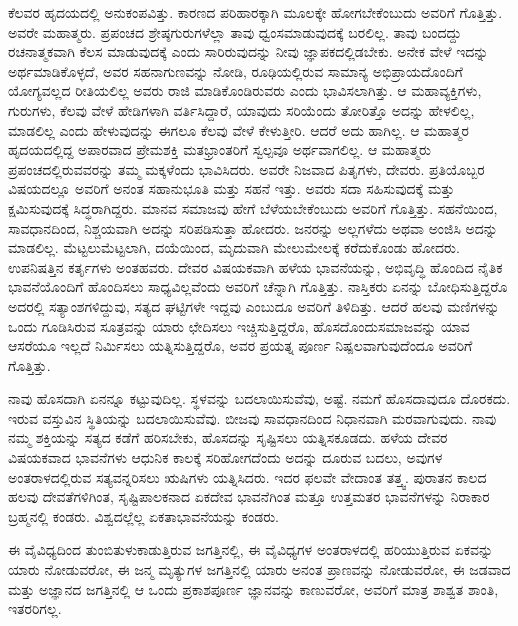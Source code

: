 \vskip 0.2cm

ಕೆಲವರ ಹೃದಯದಲ್ಲಿ ಅನುಕಂಪವಿತ್ತು. ಕಾರಣದ ಪರಿಹಾರಕ್ಕಾಗಿ ಮೂಲಕ್ಕೇ ಹೋಗಬೇಕೆಂಬುದು ಅವರಿಗೆ ಗೊತ್ತಿತ್ತು. ಅವರೇ ಮಹಾತ್ಮರು. ಪ್ರಪಂಚದ ಶ್ರೇಷ್ಠಗುರುಗಳೆಲ್ಲಾ ತಾವು ಧ್ವಂಸಮಾಡುವುದಕ್ಕೆ ಬರಲಿಲ್ಲ. ತಾವು ಬಂದದ್ದು ರಚನಾತ್ಮಕವಾಗಿ ಕೆಲಸ ಮಾಡುವುದಕ್ಕೆ ಎಂದು ಸಾರಿರುವುದನ್ನು ನೀವು ಜ್ಞಾಪಕದಲ್ಲಿಡಬೇಕು. ಅನೇಕ ವೇಳೆ ಇದನ್ನು ಅರ್ಥಮಾಡಿಕೊಳ್ಳದೆ, ಅವರ ಸಹನಾಗುಣವನ್ನು ನೋಡಿ, ರೂಢಿಯಲ್ಲಿರುವ ಸಾಮಾನ್ಯ ಅಭಿಪ್ರಾಯದೊಂದಿಗೆ ಯೋಗ್ಯವಲ್ಲದ ರೀತಿಯಲಿಲ್ಲ ಅವರು ರಾಜಿ ಮಾಡಿಕೊಂಡಿರುವರು ಎಂದು ಭಾವಿಸಲಾಗಿತ್ತು. ಆ ಮಹಾವ್ಯಕ್ತಿಗಳು, ಗುರುಗಳು, ಕೆಲವು ವೇಳೆ ಹೇಡಿಗಳಾಗಿ ವರ್ತಿಸಿದ್ದಾರೆ, ಯಾವುದು ಸರಿಯೆಂದು ತೋರಿತ್ತೊ ಅದನ್ನು ಹೇಳಲಿಲ್ಲ, ಮಾಡಲಿಲ್ಲ ಎಂದು ಹೇಳುವುದನ್ನು ಈಗಲೂ ಕೆಲವು ವೇಳೆ ಕೇಳುತ್ತೀರಿ. ಆದರೆ ಅದು ಹಾಗಿಲ್ಲ. ಆ ಮಹಾತ್ಮರ ಹೃದಯದಲ್ಲಿದ್ದ ಅಪಾರವಾದ ಪ್ರೇಮಶಕ್ತಿ ಮತಭ್ರಾಂತರಿಗೆ ಸ್ವಲ್ಪವೂ ಅರ್ಥವಾಗಲಿಲ್ಲ. ಆ ಮಹಾತ್ಮರು ಪ್ರಪಂಚದಲ್ಲಿರುವವರನ್ನು ತಮ್ಮ ಮಕ್ಕಳೆಂದು ಭಾವಿಸಿದರು. ಅವರೇ ನಿಜವಾದ ಪಿತೃಗಳು, ದೇವರು. ಪ್ರತಿಯೊಬ್ಬರ ವಿಷಯದಲ್ಲೂ ಅವರಿಗೆ ಅನಂತ ಸಹಾನುಭೂತಿ ಮತ್ತು ಸಹನೆ ಇತ್ತು. ಅವರು ಸದಾ ಸಹಿಸುವುದಕ್ಕೆ ಮತ್ತು ಕ್ಷಮಿಸುವುದಕ್ಕೆ ಸಿದ್ಧರಾಗಿದ್ದರು. ಮಾನವ ಸಮಾಜವು ಹೇಗೆ ಬೆಳೆಯಬೇಕೆಂಬುದು ಅವರಿಗೆ ಗೊತ್ತಿತ್ತು. ಸಹನೆಯಿಂದ, ಸಾವಧಾನದಿಂದ, ನಿಶ್ಚಯವಾಗಿ ಅದನ್ನು ಸರಿಪಡಿಸುತ್ತಾ ಹೋದರು. ಜನರನ್ನು ಅಲ್ಲಗಳೆದು ಅಥವಾ ಅಂಜಿಸಿ ಅದನ್ನು ಮಾಡಲಿಲ್ಲ. ಮೆಟ್ಟಲುಮೆಟ್ಟಲಾಗಿ, ದಯೆಯಿಂದ, ಮೃದುವಾಗಿ ಮೇಲುಮೇಲಕ್ಕೆ ಕರೆದುಕೊಂಡು ಹೋದರು. ಉಪನಿಷತ್ತಿನ ಕರ್ತೃಗಳು ಅಂತಹವರು. ದೇವರ ವಿಷಯಕವಾಗಿ ಹಳೆಯ ಭಾವನೆಯನ್ನು, ಅಭಿವೃದ್ಧಿ ಹೊಂದಿದ ನೈತಿಕ ಭಾವನೆಯೊಂದಿಗೆ ಹೊಂದಿಸಲು ಸಾಧ್ಯವಿಲ್ಲವೆಂದು ಅವರಿಗೆ ಚೆನ್ನಾಗಿ ಗೊತ್ತಿತ್ತು. ನಾಸ್ತಿಕರು ಏನನ್ನು ಬೋಧಿಸುತ್ತಿದ್ದರೊ ಅದರಲ್ಲಿ ಸತ್ಯಾಂಶಗಳಿದ್ದುವು, ಸತ್ಯದ ಘಟ್ಟಿಗಳೇ ಇದ್ದವು ಎಂಬುದೂ ಅವರಿಗೆ ತಿಳಿದಿತ್ತು. ಆದರೆ ಹಲವು ಮಣಿಗಳನ್ನು ಒಂದು ಗೂಡಿಸಿರುವ ಸೂತ್ರವನ್ನು ಯಾರು ಛೇದಿಸಲು ಇಚ್ಚಿಸುತ್ತಿದ್ದರೊ, ಹೊಸದೊಂದು\break ಸಮಾಜವನ್ನು ಯಾವ ಆಸರೆಯೂ ಇಲ್ಲದೆ ನಿರ್ಮಿಸಲು ಯತ್ನಿಸುತ್ತಿದ್ದರೊ, ಅವರ ಪ್ರಯತ್ನ ಪೂರ್ಣ ನಿಷ್ಪಲವಾಗುವುದೆಂದೂ ಅವರಿಗೆ ಗೊತ್ತಿತ್ತು.

\vskip 0.2cm

ನಾವು ಹೊಸದಾಗಿ ಏನನ್ನೂ ಕಟ್ಟುವುದಿಲ್ಲ. ಸ್ಥಳವನ್ನು ಬದಲಾಯಿಸುವೆವು, ಅಷ್ಟೆ. ನಮಗೆ ಹೊಸದಾವುದೂ ದೊರಕದು. ಇರುವ ವಸ್ತುವಿನ ಸ್ಥಿತಿಯನ್ನು ಬದಲಾಯಿಸುವೆವು. ಬೀಜವು ಸಾವಧಾನದಿಂದ ನಿಧಾನವಾಗಿ ಮರವಾಗುವುದು. ನಾವು ನಮ್ಮ ಶಕ್ತಿಯನ್ನು ಸತ್ಯದ ಕಡೆಗೆ ಹರಿಸಬೇಕು, ಹೊಸದನ್ನು ಸೃಷ್ಟಿಸಲು ಯತ್ನಿಸಕೂಡದು. ಹಳೆಯ ದೇವರ ವಿಷಯಕವಾದ ಭಾವನೆಗಳು ಆಧುನಿಕ ಕಾಲಕ್ಕೆ ಸರಿಹೋಗದೆಂದು ಅದನ್ನು ದೂರುವ ಬದಲು, ಅವುಗಳ ಅಂತರಾಳದಲ್ಲಿರುವ ಸತ್ಯವನ್ನರಿಸಲು ಋಷಿಗಳು ಯತ್ನಿಸಿದರು. ಇದರ ಫಲವೇ ವೇದಾಂತ ತತ್ತ್ವ. ಪುರಾತನ ಕಾಲದ ಹಲವು ದೇವತೆಗಳಿಗಿಂತ, ಸೃಷ್ಟಿಪಾಲಕನಾದ ಏಕದೇವ ಭಾವನೆಗಿಂತ ಮತ್ತೂ ಉತ್ತಮತರ ಭಾವನೆಗಳನ್ನು ನಿರಾಕಾರ ಬ್ರಹ್ಮನಲ್ಲಿ ಕಂಡರು. ವಿಶ್ವದಲ್ಲೆಲ್ಲ ಏಕತಾಭಾವನೆಯನ್ನು ಕಂಡರು.

\vskip 0.2cm

ಈ ವೈವಿಧ್ಯದಿಂದ ತುಂಬಿತುಳುಕಾಡುತ್ತಿರುವ ಜಗತ್ತಿನಲ್ಲಿ, ಈ ವೈವಿಧ್ಯಗಳ ಅಂತರಾಳದಲ್ಲಿ ಹರಿಯುತ್ತಿರುವ ಏಕವನ್ನು ಯಾರು ನೋಡುವರೋ, ಈ ಜನ್ಮ ಮೃತ್ಯುಗಳ ಜಗತ್ತಿನಲ್ಲಿ ಯಾರು ಅನಂತ ಪ್ರಾಣವನ್ನು ನೋಡುವರೋ, ಈ ಜಡವಾದ ಮತ್ತು ಅಜ್ಞಾನದ ಜಗತ್ತಿನಲ್ಲಿ ಆ ಒಂದು ಪ್ರಕಾಶಪೂರ್ಣ ಜ್ಞಾನವನ್ನು ಕಾಣುವರೋ, ಅವರಿಗೆ ಮಾತ್ರ ಶಾಶ್ವತ ಶಾಂತಿ, ಇತರರಿಗಲ್ಲ.

